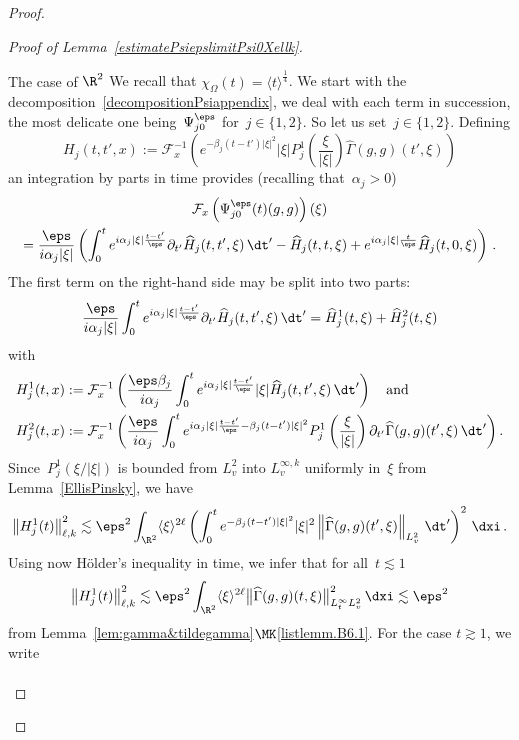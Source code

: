 \begin{proof}
\begin{proof}[{Proof of Lemma~\ref{estimatePsiepslimitPsi0Xellk}}]
\begin{step}{The case of $\R^2$}
We recall that {$\chi_\Omega(t) = \langle t \rangle^{\frac14} $}. We start with the decomposition~\eqref{decompositionPsiappendix}, we deal with each term in succession, the most delicate one being~$\Psi^\eps_{j0}$ for~$j\in\{1,2\}$. So let us set~$j\in\{1,2\}$. Defining
\[
H_j(t,t',x):= \mathcal{F}_x^{-1} \left(e^{- \beta_j (t-t') |\xi|^2} |\xi|P_{j}^1\left(\frac{\xi}{|\xi|}\right) \widehat {\Gamma}(g,g)(t',\xi)\right)
\]
an integration by parts in time provides (recalling that~$\alpha_j>0$)
\begin{multline}\label{decomposepsij0}
\mathcal{F}_x \left(\Psi^\eps_{j0}(t)(g,g)\right)(\xi)\\
=\frac{\eps}{i \alpha_j|\xi|} \left(\int_0^t e^{i\alpha_j |\xi|\frac{{t-t'}}{\eps}}\partial_{t'} \widehat H_j(t,{t'},\xi)\,\dt' - \widehat H_j(t,t,\xi)+ e^{i\alpha_j |\xi| \frac{t}{\eps}} \widehat H_j(t,0,\xi)\right)\,.
\end{multline}
The first term on the right-hand side may be split into two parts:
\[
\frac{\eps}{i \alpha_j|\xi|} \int_0^t e^{i\alpha_j |\xi|\frac{t-t'}{\eps}}\partial_{t'} \widehat H_j(t,{t'},\xi)\,\dt'= \widehat H^1_j(t,\xi)+ \widehat H^2_j(t,\xi)
\]
with
\begin{align*}
H^1_j(t,x)&:= \mathcal{F}_x^{-1} \left(\frac{\eps\beta_j}{i \alpha_j } \int_0^t e^{i\alpha_j |\xi|\frac{t-t'}{\eps}} |\xi|\widehat H_j(t,{t'},\xi)\, \dt'\right)
\quad \text{and}\\
H^2_j(t,x)&:= \mathcal{F}_x^{-1} \left(\frac{\eps }{i \alpha_j } \int_0^t e^{i\alpha_j |\xi|\frac{t-t'}{\eps} - \beta_j (t-{t'}) |\xi|^2}P_{j}^1\left(\frac{\xi}{|\xi|}\right)\partial_{t'}\widehat {\Gamma}(g,g)({t'},\xi)
\, \dt'\right).
\end{align*}
Since~$P_{j}^1(\xi/|\xi|)$ is bounded from $L^2_v$ into $L^{\infty,k}_v$ uniformly in~$\xi$ from Lemma~\ref{EllisPinsky}, we have
\[
\left\|H^1_j(t)\right\|_{\ell,k}^2 \lesssim\eps^2 \int_{\R^2} \langle \xi \rangle^{2\ell} \left(\int_0^t e^{- \beta_j (t-{t'}) |\xi|^2}|\xi|^2 \left\| \widehat {\Gamma}(g,g)({t'},\xi)\right\|_{L^2_v}\,\dt'\right)^2 \, \dxi
\,.
\]
Using now H\"older's inequality in time, we infer that for all~$t\lesssim 1$
\[
\left\|H^1_j(t)\right\|^2_{\ell,k} \lesssim \eps^2 \int_{\R^2} \langle \xi \rangle^{2\ell} \big\| \widehat {\Gamma}(g,g)({t},\xi)\big\|_{L^\infty_{t}L^2_v} ^2 \, \dxi \lesssim \eps^2
\]
from Lemma~\ref{lem:gamma&tildegamma}$\MK$\eqref{listlemm.B6.1}. For the case $t \gtrsim 1$, we write
\begin{multline*}

\end{multline*}
\end{step}
\end{proof}
\end{proof}
